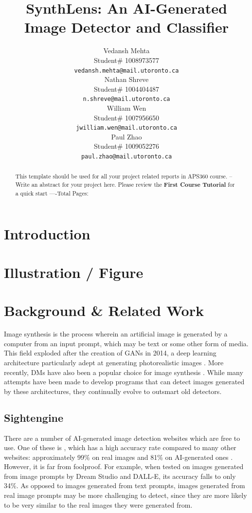 \documentclass{article} %
\title{SynthLens: An AI-Generated Image Detector and Classifier}
\author{Vedansh Mehta  \\
Student\# 1008973577 \\
\texttt{vedansh.mehta@mail.utoronto.ca} \\
\And
Nathan Shreve  \\
Student\# 1004404487 \\
\texttt{n.shreve@mail.utoronto.ca} \\
\AND
William Wen  \\
Student\# 1007956650 \\
\texttt{jwilliam.wen@mail.utoronto.ca} \\
\And
Paul Zhao \\
Student\# 1009052276 \\
\texttt{paul.zhao@mail.utoronto.ca} \\
\AND
}
\begin{document}
\maketitle

\begin{abstract}
    This template should be used for all your project related reports in APS360 course. -- Write an abstract for your project here. Please review the \textbf{ First Course Tutorial} for a quick start
    ----Total Pages: \pageref{last_page}
\end{abstract}



\section{Introduction}



\section{Illustration / Figure}



\section{Background \& Related Work}

Image synthesis is the process wherein an artificial image is generated by a computer from an input prompt, which may be text or some other form of media. This field exploded after the creation of GANs in 2014, a deep learning architecture particularly adept at generating photorealistic images \citep{GANfather}. More recently, DMs have also been a popular choice for image synthesis \citep{latent-diffusion}. While many attempts have been made to develop programs that can detect images generated by these architectures, they continually evolve to outsmart old detectors.

\subsection{Sightengine}

There are a number of AI-generated image detection websites which are free to use. One of these is \citet{sightengine}, which has a high accuracy rate compared to many other websites: approximately 99\% on real images and 81\% on AI-generated ones \citep{li2024adversarialaiartunderstandinggeneration}. However, it is far from foolproof. For example, when tested on images generated from image prompts by Dream Studio and DALL-E, its accuracy falls to only 34\%. As opposed to images generated from text prompts, images generated from real image prompts may be more challenging to detect, since they are more likely to be very similar to the real images they were generated from.
\end{document}
